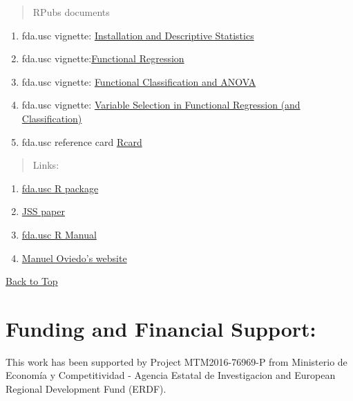 \documentclass[
]{book}
\begin{document}
\begin{quote}
RPubs documents
\end{quote}

\begin{enumerate}
\def\labelenumi{\arabic{enumi}.}
\item
  fda.usc vignette: \href{http://rpubs.com/moviedo/fda_usc_introduction}{Installation and Descriptive Statistics}
\item
  fda.usc vignette:\href{http://rpubs.com/moviedo/fda_usc_regression}{Functional Regression}
\item
  fda.usc vignette: \href{http://rpubs.com/moviedo/fda_usc_classification}{Functional Classification and ANOVA}
\item
  fda.usc vignette: \href{http://rpubs.com/moviedo/fda_usc_VS}{Variable Selection in Functional Regression (and Classification)}
\item
  fda.usc reference card \href{http://rpubs.com/moviedo/fda_usc_rcard}{Rcard}
\end{enumerate}

\begin{quote}
Links:
\end{quote}

\begin{enumerate}
\def\labelenumi{\arabic{enumi}.}
\item
  \href{http://cran.r-project.org/web/packages/fda.usc}{fda.usc R package}
\item
  \href{http://www.jstatsoft.org/article/view/v051i04}{JSS paper}
\item
  \href{https://cran.r-project.org/web/packages/fda.usc/fda.usc.pdf}{fda.usc R Manual}
\item
  \href{http://eio.usc.es/pub/moviedo}{Manuel Oviedo's website}
\end{enumerate}

\protect\hyperlink{top}{Back to Top}

\hypertarget{funding-and-financial-support}{%
\chapter{Funding and Financial Support:}\label{funding-and-financial-support}}

This work has been supported by Project MTM2016-76969-P from Ministerio de Economía y Competitividad - Agencia Estatal de Investigacion and European Regional Development Fund (ERDF).

  
\end{document}
